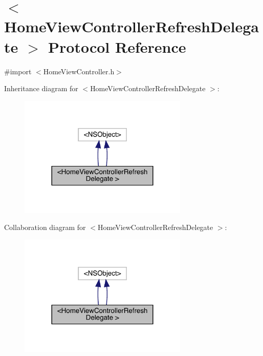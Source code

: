 \hypertarget{protocol_home_view_controller_refresh_delegate_01-p}{}\section{$<$Home\+View\+Controller\+Refresh\+Delegate $>$ Protocol Reference}
\label{protocol_home_view_controller_refresh_delegate_01-p}


{\ttfamily \#import $<$Home\+View\+Controller.\+h$>$}



Inheritance diagram for $<$Home\+View\+Controller\+Refresh\+Delegate $>$\+:\nopagebreak
\begin{figure}[H]
\begin{center}
\leavevmode
\includegraphics[width=228pt]{protocol_home_view_controller_refresh_delegate_01-p__inherit__graph}
\end{center}
\end{figure}


Collaboration diagram for $<$Home\+View\+Controller\+Refresh\+Delegate $>$\+:\nopagebreak
\begin{figure}[H]
\begin{center}
\leavevmode
\includegraphics[width=228pt]{protocol_home_view_controller_refresh_delegate_01-p__coll__graph}
\end{center}
\end{figure}
